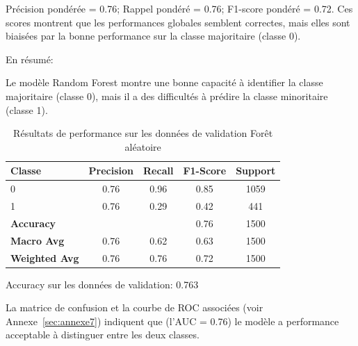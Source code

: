 \begin{flushleft}
\begin{enumerate}
Précision pondérée = 0.76; Rappel pondéré = 0.76; F1-score pondéré = 0.72. 
Ces scores montrent que les performances globales semblent correctes, mais elles sont biaisées par la bonne performance sur la classe majoritaire (classe 0).

En résumé:

Le modèle Random Forest montre une bonne capacité à identifier la classe majoritaire (classe 0), mais il a des difficultés à prédire la classe minoritaire (classe 1).
\end{enumerate}
\end{flushleft}

\begin{table}[H]
\centering
\caption{Résultats de performance sur les données de validation Forêt aléatoire}
\label{tab:performance_validation_FoAl}
\begin{tabular}{|l|c|c|c|c|}
\hline
\textbf{Classe}       & \textbf{Precision} & \textbf{Recall} & \textbf{F1-Score} & \textbf{Support} \\ \hline
0                     & 0.76               & 0.96            & 0.85              & 1059             \\ \hline
1                     & 0.76               & 0.29            & 0.42              & 441              \\ \hline
\textbf{Accuracy} & \multicolumn{2}{|c|}{} & 0.76            & 1500     \\ \hline
\textbf{Macro Avg}    & 0.76               & 0.62            & 0.63              & 1500             \\ \hline
\textbf{Weighted Avg} & 0.76               & 0.76            & 0.72              & 1500             \\ \hline
\end{tabular}
\begin{flushleft}
Accuracy sur les données de validation: 0.763
\end{flushleft}
\end{table}




\begin{flushleft}
La matrice de confusion et la courbe de ROC associées (voir Annexe~\ref{sec:annexe7}) indiquent que (l'AUC = 0.76) le modèle a performance acceptable à distinguer entre les deux classes.
\end{flushleft}
 
